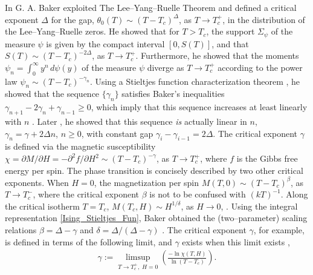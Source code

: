 \documentclass[english,12pt,jmp,graphicx]{revtex4-1}
\begin{document}
In \cite{Baker:PRB:1184,Baker-1990} G. A. Baker exploited The
Lee--Yang--Ruelle Theorem and defined a critical exponent $\Delta$ for
the gap, $\theta_0(T)\sim(T-T_c)^\Delta$, as $T\to T_c^+$, in the distribution of the
Lee--Yang--Ruelle zeros. He showed that for $T>T_c$, the support $\Sigma_\psi$
of the measure $\psi$ is given by the compact interval $[0,S(T)]$, and that
$S(T)\sim(T-T_c)^{-2\Delta}$, as $T\to T_c^+$. Furthermore, he showed that the moments
$\psi_n=\int_0^\infty y^n\,d\psi(y)$ of the measure $\psi$ diverge as $T\to T_c^+$ according to 
the power law $\psi_n\sim(T-T_c)^{-\gamma_n}$. Using a Stieltjes function
characterization theorem \cite{Baker-1990}, he showed that the sequence
$\{\gamma_n\}$ satisfies Baker's inequalities $\gamma_{n+1}-2\gamma_n+\gamma_{n-1}\geq0$, which
imply that this sequence increases at least linearly with $n$
\cite{Baker:PRL-990}. Later \cite{Baker-1990}, he showed that this
sequence \emph{is} actually linear in $n$, $\gamma_n=\gamma+2\Delta n$, $n\geq0$, with
constant gap $\gamma_i-\gamma_{i-1}=2\Delta$. The critical exponent $\gamma$ is defined
via the magnetic susceptibility $\chi=\partial M/\partial H=-\partial^2f/\partial H^2\sim(T-T_c)^{-\gamma}$, as
$T\to T_c^+$, where $f$ is the Gibbs free energy per spin. The phase
transition is concisely described by two other critical
exponents. When $H=0$, the magnetization per spin $M(T,0)\sim(T-T_c)^\beta$,
as $T\to T_c^-$, where the critical exponent $\beta$ is not to be confused
with $(kT)^{-1}$. Along the critical isotherm $T=T_c$, $M(T_c,H)\sim
H^{1/\delta}$, as $H\to0$, \cite{Christensen-2005,Baker-1990}. Using the integral 
representation \eqref{Ising_Stieltjes_Fun}, Baker obtained the
(two--parameter) scaling relations $\beta=\Delta-\gamma$ and $\delta=\Delta/(\Delta-\gamma)$
\cite{Baker-1990}. The critical exponent $\gamma$, for example, is defined
in terms of the following limit, and $\gamma$ exists when this limit exists
\cite{Baker-1990},
% 
\begin{align}\label{eq:Critical_Exponent_Existence}
  \gamma:=\limsup_{T\to T_c^+, \;H=0}\left(\frac{-\ln \chi(T,H)}{\ln(T-T_c)}  \right).
\end{align}
%
\end{document}
